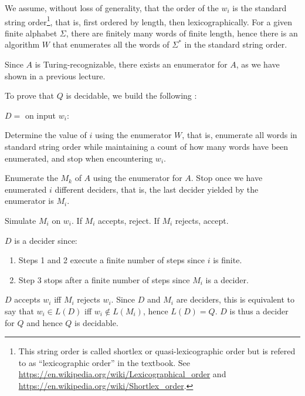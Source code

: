 We assume,
without loss of generality, that the order of the \(w_i\) is the standard
string order\footnote{%
This string order is called shortlex or quasi-lexicographic order but is refered to as
``lexicographic order'' in the textbook. See
\url{https://en.wikipedia.org/wiki/Lexicographical\_order} and
\url{https://en.wikipedia.org/wiki/Shortlex_order}.%
}, that is, first ordered by length, then lexicographically.
For a given finite alphabet \(\Sigma\), there are finitely many words of finite
length, hence there is an algorithm \(W\) that enumerates all the words of \(\Sigma^*\)
in the standard string order.

Since \(A\) is Turing-recognizable, there exists an enumerator
for \(A\), as we have shown in a previous lecture.

To prove that \(Q\) is decidable, we build the following \TM{}:

\begin{TMachine}{\(D =\) on input \(w_i\):}
\item[1.] Determine the value of \(i\) using the enumerator \(W\), that is,
enumerate all words in standard string order while maintaining a count of how
many words have been enumerated, and stop when encountering \(w_i\).
\item[2.] Enumerate the \(M_k\) of \(A\) using the enumerator for \(A\). Stop once
we have enumerated \(i\) different deciders, that is, the last decider yielded
by the enumerator is \(M_i\).
\item[3.] Simulate \(M_i\) on \(w_i\). If \(M_i\) accepts, reject. If \(M_i\) rejects, accept.
\end{TMachine}

\(D\) is a decider since:
\begin{enumerate}
\item Steps 1 and 2 execute a finite number of steps since \(i\) is finite.
\item Step 3 stops after a finite number of steps since \(M_i\) is a decider.
\end{enumerate}

\(D\) accepts \(w_i\) iff \(M_i\) rejects \(w_i\). Since \(D\) and \(M_i\) are
deciders, this is equivalent to say
that \(w_i \in L(D)\) iff \(w_i \not\in L(M_i)\), hence \(L(D) = Q\).
\(D\) is thus a decider for \(Q\) and hence \(Q\) is decidable.
